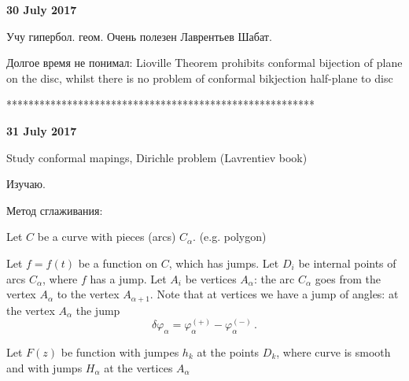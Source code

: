 



\baselineskip=14pt
\def\vare {\varepsilon}
\def\A {{\bf A}}
\def\t {\tilde}
\def\a {\alpha}
\def\K {{\bf K}}
\def\N {{\bf N}}
\def\w {\omega}
\def\s {{\sigma}}
\def\S {{\Sigma}}
\def\s {{\sigma}}
\def\p{\partial}
\def\vare{{\varepsilon}}
\def\Q {{\bf Q}}
\def\D {{\cal D}}
\def\G {{\Gamma}}
\def\C {{\bf C}}
\def\L {{\cal L}}
\def\Z {{\bf Z}}
\def\U  {{\cal U}}
\def\H {{\bf H}}
\def\R  {{\bf R}}
\def\S  {{\bf S}}
\def\E  {{\bf E}}
\def\l {\lambda}
\def\degree {{\bf {\rm degree}\,\,}}
\def \finish {${\,\,\vrule height1mm depth2mm width 8pt}$}
\def \m {\medskip}
\def\p {\partial}
\def\r {{\bf r}}
\def\pt {{\bf pt}}
\def\v {{\bf v}}
\def\n {{\bf n}}
\def\t {{\bf t}}
\def\b {{\bf b}}
\def\c {{\bf c }}
\def\e{{\bf e}}
\def\ac {{\bf a}}
\def \X   {{\bf X}}
\def \Y   {{\bf Y}}
\def \x   {{\bf x}}
\def \y   {{\bf y}}
\def \G{{\cal G}}
\def\ss  {\sigma_{\rm sph}}
\def\grad {{\rm grad\,}}





\centerline  {\bf  30 July 2017}


Учу гипербол. геом.
Очень полезен Лаврентьев Шабат.

   Долгое время не понимал:
 Lioville Theorem prohibits conformal bijection
of plane on the disc, whilst there is no problem
of conformal bikjection half-plane to disc

********************************************************

\bigskip

\centerline  {\bf  31 July 2017}

      Study conformal mapings, Dirichle problem (Lavrentiev book)
      
            Изучаю.


       Метод сглаживания:

   Let $C$ be a curve with pieces (arcs) $C_\a$.
  (e.g. polygon)
   
  Let $f=f(t)$ be a function on $C$, 
which has jumps.
Let $D_i$ be internal points
of arcs $C_\a$, where $f$ has a jump.
Let $A_i$ be vertices $A_\a$: the arc $C_\a$ 
goes from the vertex $A_\a$
to the vertex $A_{\a+1}$.
  Note that at vertices we have a jump of 
angles: at the vertex $A_\a$ 
the jump $$
\delta\varphi_\a=
\varphi_\a^{(+)}-
\varphi_\a^{(-)}\,.
    $$
 
      Let  $F(z)$ be function with jumpes $h_k$
at the points $D_k$, where curve is smooth and
  with jumps $H_\a$ at the vertices $A_\a$

